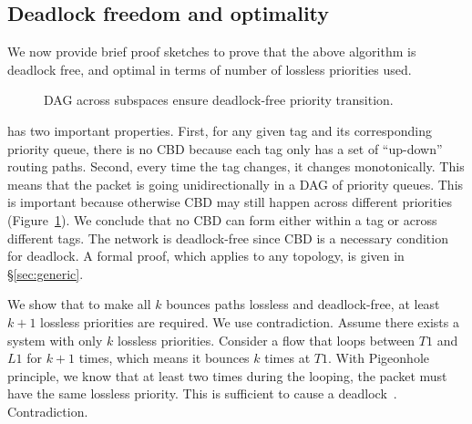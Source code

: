 \subsection {Deadlock freedom and optimality}
\label{subsec:specific_deadlock_free}

We now provide brief proof sketches to prove that the above algorithm is
deadlock free, and optimal in terms of number of lossless priorities used.

\begin{figure}[t]
	\centering
	
	
	\caption{DAG across subspaces ensure deadlock-free priority transition.}\label{fig:subspace}
\end{figure}

 \sysname{} has two
important properties. First, for any given tag and its corresponding priority
queue, there is no CBD because each tag only has a set of ``up-down'' routing
paths.  Second, every time the tag changes, it changes monotonically. This means
that the packet is going unidirectionally in a DAG of priority queues. This is
important because otherwise CBD may still happen across different priorities
(Figure~\ref{fig:subspace}).  We conclude that no CBD can form either within a
tag or across different tags.  The network is deadlock-free since CBD is a
necessary condition for deadlock.  A formal proof, which applies to any
topology, is given in \S\ref{sec:generic}.

 We show that
to make all $k$ bounces paths lossless and deadlock-free, at least $k+1$
lossless priorities are required. We use contradiction.  Assume there exists a
system with only $k$ lossless priorities. Consider a flow that loops between
$T1$ and $L1$ for $k+1$ times, which means it bounces $k$ times at $T1$. With
Pigeonhole principle, we know that at least two times during the looping, the
packet must have the same lossless priority. This is sufficient to cause
a deadlock~\cite{hu2016deadlocks}. Contradiction.

